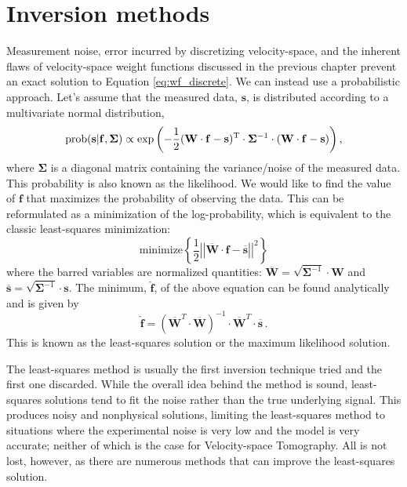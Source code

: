 \section{Inversion methods}\label{sec:methods}
Measurement noise, error incurred by discretizing velocity-space, and the inherent flaws of velocity-space weight functions discussed in the previous chapter prevent an exact solution to Equation \ref{eq:wf_discrete}. We can instead use a probabilistic approach. Let's assume that the measured data, $\mathbf{s}$, is distributed according to a multivariate normal distribution,
\begin{equation}\label{eq:likelihood}
    \rm{prob}(\mathbf{s}|\mathbf{f},\mathbf{\Sigma}) \propto \exp{\left(-\frac{1}{2} (\mathbf{W}\cdot\mathbf{f} - \mathbf{s})^T \cdot \mathbf{\Sigma}^{-1} \cdot (\mathbf{W}\cdot\mathbf{f} - \mathbf{s})\right)}\,,
\end{equation}
where $\mathbf{\Sigma}$ is a diagonal matrix containing the variance/noise of the measured data. This probability is also known as the likelihood. We would like to find the value of $\mathbf{f}$ that maximizes the probability of observing the data. This can be reformulated as a minimization of the log-probability, which is equivalent to the classic least-squares minimization:
\begin{equation}\label{eq:least_squares}
    \mathrm{minimize} \left \lbrace \frac{1}{2}\left|\left| \mathbf{\overline{W}}\cdot\mathbf{f} - \mathbf{\overline{s}}\right|\right|^2 \right \rbrace 
\end{equation}
where the barred variables are normalized quantities: $\mathbf{\overline{W}} = \sqrt{\mathbf{\Sigma}^{-1}}\cdot\mathbf{W}$ and $\mathbf{\overline{s}}=\sqrt{\mathbf{\Sigma}^{-1}}\cdot\mathbf{s}$.
The minimum, $\mathbf{\hat{f}}$, of the above equation can be found analytically and is given by
\begin{equation}\label{eq:least_squares_solution}
    \mathbf{\hat{f}} = \left(\mathbf{\overline{W}}^T\cdot\mathbf{\overline{W}}\right)^{-1}\cdot\mathbf{\overline{W}}^T \cdot \mathbf{\overline{s}}\,.
\end{equation}
This is known as the least-squares solution or the maximum likelihood solution.

The least-squares method is usually the first inversion technique tried and the first one discarded. While the overall idea behind the method is sound, least-squares solutions tend to fit the noise rather than the true underlying signal. This produces noisy and nonphysical solutions, limiting the least-squares method to situations where the experimental noise is very low and the model is very accurate; neither of which is the case for Velocity-space Tomography.
All is not lost, however, as there are numerous methods that can improve the least-squares solution.   

